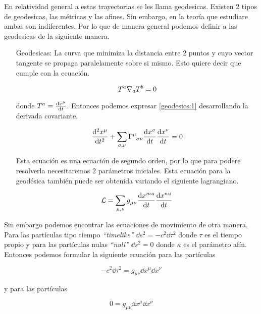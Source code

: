 \documentclass[../Main.tex]{subfiles}
\begin{document}
En relatividad general a estas trayectorias se les llama geodesicas. Existen 2 tipos de geodesicas, las métricas y las afines. Sin embargo, en la teoría que estudiare ambas son indiferentes. Por lo que de manera general podemos definir a las geodesicas de la siguiente manera.
\begin{itemize}
    \item[Geodesicas:]   La curva que minimiza la distancia entre 2 puntos y cuyo vector tangente se propaga paralelamente sobre si mismo. Esto quiere decir que cumple con la ecuación.
    
    \begin{equation}
        \tensor{T}{^{a}}\nabla_{a}{\tensor{T}{^{b}}} = 0
        \label{geodesics:1}
    \end{equation} 

    donde $\tensor{T}{^a} = \dv{x^{\mu}}{t}$. Entonces podemos expresar \eqref{geodesics:1} desarrollando la derivada covariante.

    \begin{equation}
        \dv[2]{x^{\mu}}{t} + \sum_{\sigma, \nu}\tensor{\Gamma}{^{\mu}_{\sigma \nu}}\dv{x^{\sigma}}{t}\dv{x^{\nu}}{t} = 0
    \end{equation}

    Esta ecuación es una ecuación de segundo orden, por lo que para podere resolverla necesitaremos 2 parámetros iniciales. Esta ecuación para la geodésica también puede ser obtenida variando el siguiente lagrangiano.

    \begin{equation}
        \mathcal{L} = \sum_{\mu,\nu}\tensor{g}{_{\mu\nu}}\dv{x^{mu}}{t}\dv{x^{nu}}{t}
    \end{equation}  
\end{itemize}

Sin embargo podemos encontrar las ecuaciones de movimiento de otra manera. Para las partículas tipo tiempo \textit{``timelike''} $\dd{s}^{2} = -c^{2}\dd{\tau}^{2}$ donde $\tau$ es el tiempo propio y para las partículas nulas \textit{``null''} $\dd{s}^{2} = 0$ donde $\kappa$ es el parámetro afín. Entonces podemos formular la siguiente ecuación para las partículas \tl

\begin{equation}
    -c^{2}\dd{\tau}^{2} = g_{\mu\nu} \dd{x}^{\mu}\dd{x}^{\nu}
    \label{timelikegeodesics}
\end{equation}

y para las partículas \nl

\begin{equation}
    0 = g_{\mu\nu} \dd{x}^{\mu}\dd{x}^{\nu}
    \label{nullgeodesics}
\end{equation}
\end{document}
